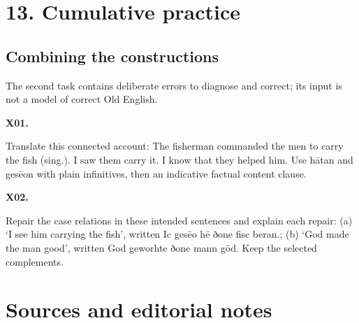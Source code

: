 \section*{13. Cumulative practice}

\subsection*{Combining the constructions}

The second task contains deliberate errors to diagnose and correct; its input is not a model of correct Old English.

\par\begin{minipage}{\linewidth}\raggedright
\textbf{X01.}

Translate this connected account: The fisherman commanded the men to carry the fish (sing.). I saw them carry it. I know that they helped him. Use hātan and gesēon with plain infinitives, then an indicative factual content clause.

\end{minipage}\par\addvspace{4pt}

\par\begin{minipage}{\linewidth}\raggedright
\textbf{X02.}

Repair the case relations in these intended sentences and explain each repair: (a) ‘I see him carrying the fish’, written Ic gesēo hē ðone fisc beran.; (b) ‘God made the man good’, written God geworhte ðone mann gōd. Keep the selected complements.

\end{minipage}\par\addvspace{4pt}

\clearpage
\section*{Sources and editorial notes}

